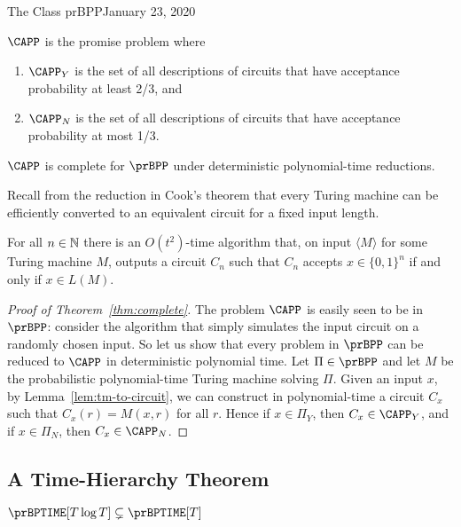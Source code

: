 \begin{lecture}{1}{The Class prBPP}{January 23, 2020}
\begin{definition}[$\CAPP$]
  $\CAPP$ is the promise problem where
  \begin{enumerate}
    \item $\CAPP_Y$ is the set of all descriptions of circuits that have
      acceptance probability at least 2/3, and
    \item $\CAPP_N$ is the set of all descriptions of circuits that have
      acceptance probability at most 1/3.
  \end{enumerate}
\end{definition}

\begin{theorem}\label{thm:complete}
  $\CAPP$ is complete for $\prBPP$ under deterministic polynomial-time reductions.
\end{theorem}

Recall from the reduction in Cook's theorem that every Turing machine can be
efficiently converted to an equivalent circuit for a fixed input length.
\begin{lemma}\label{lem:tm-to-circuit}
  For all $n \in \mathbb{N}$ there is an $O(t^2)$-time algorithm that, on input
  $\langle M \rangle$ for some Turing machine $M$, outputs a circuit $C_n$ such
  that $C_n$ accepts $x \in \{0, 1\}^n$ if and only if $x \in L(M)$.
\end{lemma}

\begin{proof}[Proof of Theorem~\ref{thm:complete}]
  The problem $\CAPP$ is easily seen to be in $\prBPP$: consider the algorithm
  that simply simulates the input circuit on a randomly chosen input. So let us
  show that every problem in $\prBPP$ can be reduced to $\CAPP$ in
  deterministic polynomial time. Let $\Pi \in \prBPP$ and let $M$ be the
  probabilistic polynomial-time Turing machine solving $\Pi$. Given an input
  $x$, by Lemma~\ref{lem:tm-to-circuit}, we can construct in polynomial-time a
  circuit $C_x$ such that $C_x(r) = M(x, r)$ for all $r$. Hence if $x \in
  \Pi_Y$, then $C_x \in \CAPP_Y$, and if $x \in \Pi_N$, then $C_x \in \CAPP_N$.
\end{proof}

\subsection{A Time-Hierarchy Theorem}

\begin{theorem}
  $\prBPTIME[T \log{T}] \subsetneq \prBPTIME[T]$
\end{theorem}


\end{lecture}
